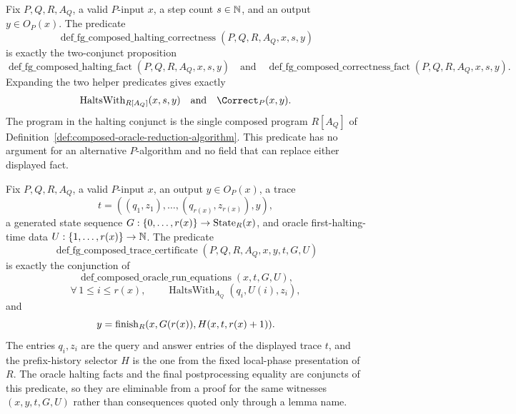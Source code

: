 \begin{definition}
  \label{def:fg-composed-halting-correctness}
  Fix $P,Q,R,A_Q$, a valid $P$-input $x$, a step count $s\in\mathbb{N}$, and an output
  $y\in O_P(x)$.  The predicate
  \[
    \operatorname{def\_fg\_composed\_halting\_correctness}(P,Q,R,A_Q,x,s,y)
  \]
  is exactly the two-conjunct proposition
  \[
    \operatorname{def\_fg\_composed\_halting\_fact}(P,Q,R,A_Q,x,s,y)
    \quad\text{and}\quad
    \operatorname{def\_fg\_composed\_correctness\_fact}(P,Q,R,A_Q,x,s,y).
  \]
  Expanding the two helper predicates gives exactly
  \[
    \operatorname{HaltsWith}_{R[A_Q]}(x,s,y)
    \quad\text{and}\quad
    \Correct_P(x,y).
  \]
  The program in the halting conjunct is the single composed program $R[A_Q]$
  of Definition~\ref{def:composed-oracle-reduction-algorithm}.  This predicate
  has no argument for an alternative $P$-algorithm and no field that can
  replace either displayed fact.
\end{definition}

\begin{definition}
  \label{def:fg-composed-trace-certificate}
  Fix $P,Q,R,A_Q$, a valid $P$-input $x$, an output $y\in O_P(x)$, a trace
  \[
    t=((q_1,z_1),\ldots,(q_{r(x)},z_{r(x)}),y),
  \]
  a generated state sequence $G:\{0,\ldots,r(x)\}\to\operatorname{State}_R(x)$, and oracle
  first-halting-time data $U:\{1,\ldots,r(x)\}\to\mathbb{N}$.  The predicate
  \[
    \operatorname{def\_fg\_composed\_trace\_certificate}(P,Q,R,A_Q,x,y,t,G,U)
  \]
  is exactly the conjunction of
  \[
    \operatorname{def\_composed\_oracle\_run\_equations}(x,t,G,U),
  \]
  \[
    \forall\,1\leq i\leq r(x),\qquad
      \operatorname{HaltsWith}_{A_Q}(q_i,U(i),z_i),
  \]
  and
  \[
    y=\operatorname{finish}_R(x,G(r(x)),H(x,t,r(x)+1)).
  \]
  The entries $q_i,z_i$ are the query and answer entries of the displayed trace
  $t$, and the prefix-history selector $H$ is the one from the fixed
  local-phase presentation of $R$.  The oracle halting facts and the final
  postprocessing equality are conjuncts of this predicate, so they are
  eliminable from a proof for the same witnesses $(x,y,t,G,U)$ rather than
  consequences quoted only through a lemma name.
\end{definition}

